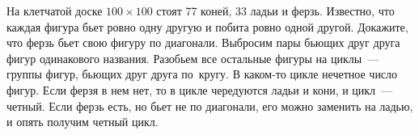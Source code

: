 \problem
На клетчатой доске $100 \times 100$ стоят 77 коней, 33 ладьи и ферзь.
Известно, что каждая фигура бьет ровно одну другую и побита ровно одной другой.
Докажите, что ферзь бьет свою фигуру по диагонали.
\solution
Выбросим пары бьющих друг друга фигур одинакового названия.
Разобьем все остальные фигуры на циклы~--- группы фигур, бьющих друг друга
по~кругу.
В каком-то цикле нечетное число фигур.
Если ферзя в нем нет, то в цикле чередуются ладьи и кони, и цикл~--- четный.
Если ферзь есть, но бьет не по диагонали, его можно заменить на ладью, и опять
получим четный цикл. 
\endproblem
